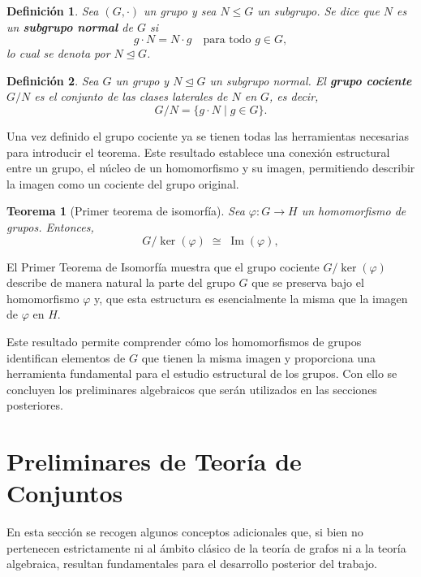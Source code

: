 \documentclass[11pt,a4paper,spanish]{report}
\theoremstyle{plain}
\newtheorem{teorema}{Teorema}[chapter]
\newtheorem{definicion}{Definición}[chapter]
\begin{document}
\begin{definicion}\cite{dummit2004abstract}
Sea $(G,\cdot)$ un grupo y sea $N \leq G$ un subgrupo.  
Se dice que $N$ es un \textbf{subgrupo normal} de $G$ si
\[
g\cdot N = N\cdot g \quad \text{para todo } g \in G,
\]
lo cual se denota por $N \trianglelefteq G$.
\end{definicion}

\begin{definicion}\cite{dummit2004abstract}
Sea $G$ un grupo y $N \trianglelefteq G$ un subgrupo normal.  
El \textbf{grupo cociente} $G/N$ es el conjunto de las clases laterales de $N$ en $G$, es decir,
\[
G/N = \{g\cdot N \mid g \in G\}.
\]

\end{definicion}

Una vez definido el grupo cociente ya se tienen todas las herramientas necesarias para introducir el teorema. Este resultado establece una conexi\'on estructural entre un grupo, el n\'ucleo 
de un homomorfismo y su imagen, permitiendo describir la imagen como un 
cociente del grupo original.

\begin{teorema}[Primer teorema de isomorfía]\cite{dummit2004abstract}\label{primer}
Sea $\varphi : G \to H$ un homomorfismo de grupos. Entonces,
\[
G / \ker(\varphi)\;\cong\;\operatorname{Im}(\varphi),
\]

\end{teorema}


El Primer Teorema de Isomorfía muestra que el grupo cociente $G/\ker(\varphi)$
describe de manera natural la parte del grupo $G$ que se preserva bajo el
homomorfismo $\varphi$ y, que esta estructura es esencialmente la misma que
la imagen de $\varphi$ en $H$.

Este resultado permite comprender cómo los homomorfismos de grupos
identifican elementos de $G$ que tienen la misma imagen y proporciona una
herramienta fundamental para el estudio estructural de los grupos. Con ello
se concluyen los preliminares algebraicos que serán utilizados en las secciones
posteriores.



\section{Preliminares de Teoría de Conjuntos}
En esta sección se recogen algunos conceptos adicionales que, si bien no 
pertenecen estrictamente ni al ámbito clásico de la teoría de grafos ni a la teoría algebraica, resultan fundamentales para el desarrollo 
posterior del trabajo.
\end{document}
